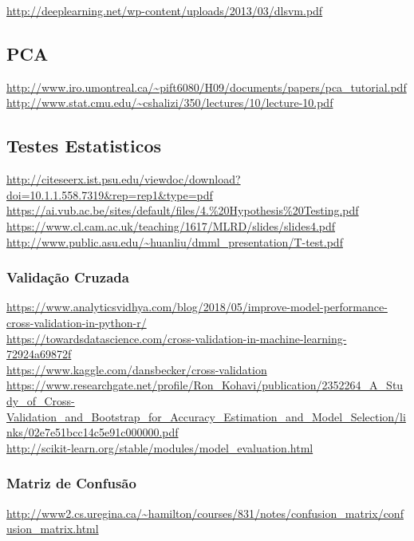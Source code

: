 \documentclass[12pt]{article}
\begin{document}
	\url{http://deeplearning.net/wp-content/uploads/2013/03/dlsvm.pdf}

\subsection{PCA}

\url{http://www.iro.umontreal.ca/~pift6080/H09/documents/papers/pca_tutorial.pdf}\\
\url{http://www.stat.cmu.edu/~cshalizi/350/lectures/10/lecture-10.pdf}

\subsection{Testes Estatisticos}

	\url{http://citeseerx.ist.psu.edu/viewdoc/download?doi=10.1.1.558.7319&rep=rep1&type=pdf}\\
	\url{https://ai.vub.ac.be/sites/default/files/4.\%20Hypothesis\%20Testing.pdf}\\
	\url{https://www.cl.cam.ac.uk/teaching/1617/MLRD/slides/slides4.pdf}\\
	\url{http://www.public.asu.edu/~huanliu/dmml_presentation/T-test.pdf}

	\subsubsection{Validação Cruzada}
	
		\url{https://www.analyticsvidhya.com/blog/2018/05/improve-model-performance-cross-validation-in-python-r/}\\
		\url{https://towardsdatascience.com/cross-validation-in-machine-learning-72924a69872f}\\
		\url{https://www.kaggle.com/dansbecker/cross-validation}\\
		\url{https://www.researchgate.net/profile/Ron_Kohavi/publication/2352264_A_Study_of_Cross-Validation_and_Bootstrap_for_Accuracy_Estimation_and_Model_Selection/links/02e7e51bcc14c5e91c000000.pdf}\\
		\url{http://scikit-learn.org/stable/modules/model_evaluation.html}
		
	\subsubsection{Matriz de Confusão}
	
		\url{http://www2.cs.uregina.ca/~hamilton/courses/831/notes/confusion_matrix/confusion_matrix.html}\\
		
\end{document}
